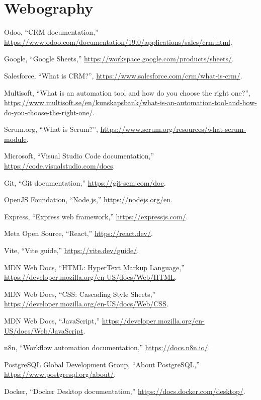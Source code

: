 \documentclass[12pt,a4paper,oneside]{report}
\begin{document}
\chapter*{Webography}
\begin{enumerate}[label={\textup{[W\arabic*]}}, leftmargin=1.5cm]
\item Odoo, ``CRM documentation,'' \url{https://www.odoo.com/documentation/19.0/applications/sales/crm.html}.
\item Google, ``Google Sheets,'' \url{https://workspace.google.com/products/sheets/}.
\item Salesforce, ``What is CRM?'', \url{https://www.salesforce.com/crm/what-is-crm/}.
\item Multisoft, ``What is an automation tool and how do you choose the right one?'', \url{https://www.multisoft.se/en/kunskapsbank/what-is-an-automation-tool-and-how-do-you-choose-the-right-one/}.
\item Scrum.org, ``What is Scrum?'', \url{https://www.scrum.org/resources/what-scrum-module}.
\item Microsoft, ``Visual Studio Code documentation,'' \url{https://code.visualstudio.com/docs}.
\item Git, ``Git documentation,'' \url{https://git-scm.com/doc}.
\item OpenJS Foundation, ``Node.js,'' \url{https://nodejs.org/en}.
\item Express, ``Express web framework,'' \url{https://expressjs.com/}.
\item Meta Open Source, ``React,'' \url{https://react.dev/}.
\item Vite, ``Vite guide,'' \url{https://vite.dev/guide/}.
\item MDN Web Docs, ``HTML: HyperText Markup Language,'' \url{https://developer.mozilla.org/en-US/docs/Web/HTML}.
\item MDN Web Docs, ``CSS: Cascading Style Sheets,'' \url{https://developer.mozilla.org/en-US/docs/Web/CSS}.
\item MDN Web Docs, ``JavaScript,'' \url{https://developer.mozilla.org/en-US/docs/Web/JavaScript}.
\item n8n, ``Workflow automation documentation,'' \url{https://docs.n8n.io/}.
\item PostgreSQL Global Development Group, ``About PostgreSQL,'' \url{https://www.postgresql.org/about/}.
\item Docker, ``Docker Desktop documentation,'' \url{https://docs.docker.com/desktop/}.

\end{enumerate}
\end{document}
